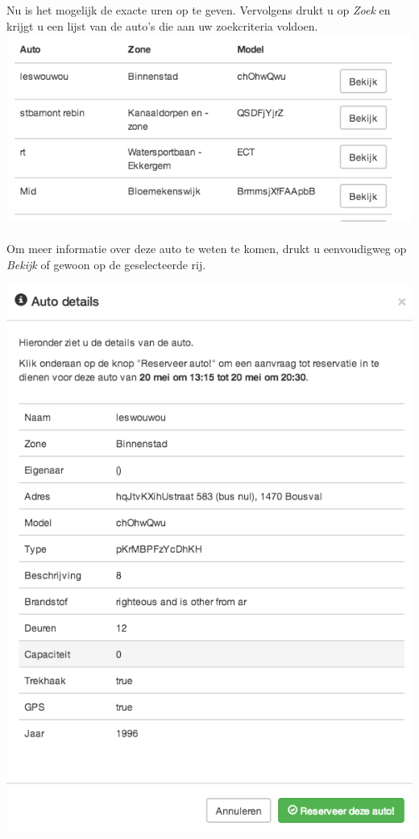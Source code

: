 \documentclass[11pt,a4paper,oneside]{article}
\begin{document}
Nu is het mogelijk de exacte uren op te geven. Vervolgens drukt u op \textit{Zoek} en krijgt u een lijst van de auto's die aan uw zoekcriteria voldoen. \\
\includegraphics[scale=0.75]{img/lijstautos} \\\\
Om meer informatie over deze auto te weten te komen, drukt u eenvoudigweg op \textit{Bekijk} of gewoon op de geselecteerde rij.
\begin{center}
\includegraphics[scale=0.75]{img/bekijk}
\end{center}
\end{document}
